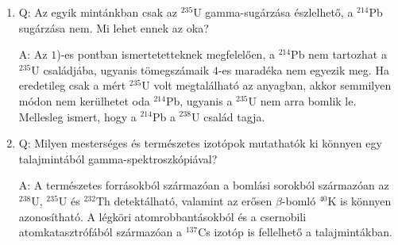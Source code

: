 \begin{enumerate}
    \item Q: Az egyik mintánkban csak az $^{235}$U gamma-sugárzása észlelhető, a $^{214}$Pb sugárzása nem. Mi lehet ennek az oka?
    \begin{displayquote}
        A: Az $1$)-es pontban ismertetetteknek megfelelően, a $^{214}$Pb nem tartozhat a $^{235}$U családjába, ugyanis tömegszámaik $4$-es maradéka nem egyezik meg. Ha eredetileg csak a mért $^{235}$U volt megtalálható az anyagban, akkor semmilyen módon nem kerülhetet oda $^{214}$Pb, ugyanis a $^{235}$U nem arra bomlik le. Mellesleg ismert, hogy a $^{214}$Pb a $^{238}$U család tagja.
    \end{displayquote}
    
    \item Q: Milyen mesterséges és természetes izotópok mutathatók ki könnyen egy talajmintából gamma-spektroszkópiával?
    \begin{displayquote}
        A: A természetes forrásokból származóan a bomlási sorokból származóan az $^{238}$U, $^{235}$U és $^{232}$Th detektálható, valamint az erősen $\beta$-bomló $^{40}$K is könnyen azonosítható. A légköri atomrobbantásokból és a csernobili atomkatasztrófából származóan a $^{137}$Cs izotóp is fellelhető a talajmintákban.
    \end{displayquote}
\end{enumerate}